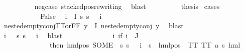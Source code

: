 \begin{isabellebody}
\ \ \ \ \ \ \ \ \isamarkupfalse%
\ neg{\isacharunderscore}{\kern0pt}case\ stacked{\isacharunderscore}{\kern0pt}pos{\isacharunderscore}{\kern0pt}rewriting\ \isamarkupfalse%
\ blast\isanewline
\ \ \ \ \ \ \isamarkupfalse%
\ \isamarkupfalse%
\ {\isacharquery}{\kern0pt}thesis\ \isamarkupfalse%
{\isacharparenleft}{\kern0pt}cases{\isacharparenright}{\kern0pt}\isanewline
\ \ \ \ \ \ \ \ \isamarkupfalse%
\ {}\isanewline
\ \ \ \ \ \ \ \ \isamarkupfalse%
\ False\ \isamarkupfalse%
\ {\isachardoublequoteopen}{\isasymforall}i\ {\isasymin}\ I{\isachardot}{\kern0pt}\ {\isacharparenleft}{\kern0pt}{\isasymforall}s{\isachardot}{\kern0pt}\ {\isacharparenleft}{\kern0pt}s\ {\isasymTurnstile}\ {\isacharparenleft}{\kern0pt}{\isasymPhi}\ i{\isacharparenright}{\kern0pt}{\isacharparenright}{\kern0pt}{\isacharparenright}{\kern0pt}{\isachardoublequoteclose}\isanewline
\ \ \ \ \ \ \ \ \isamarkupfalse%
\ nested{\isacharunderscore}{\kern0pt}empty{\isacharunderscore}{\kern0pt}conj{\isacharunderscore}{\kern0pt}TT{\isacharunderscore}{\kern0pt}or{\isacharunderscore}{\kern0pt}FF\ {\isacartoucheopen}{\isasymforall}y{\isasymin}{\isasymPhi}\ {\isacharbackquote}{\kern0pt}\ I{\isachardot}{\kern0pt}\ nested{\isacharunderscore}{\kern0pt}empty{\isacharunderscore}{\kern0pt}conj\ y{\isacartoucheclose}\ \isamarkupfalse%
\ blast\ \isanewline
\ \ \ \ \ \ \ \ \isamarkupfalse%
\ {\isachardoublequoteopen}{\isasymforall}i\ {\isasymin}\ {\isacharbraceleft}{\kern0pt}{\isacharbraceright}{\kern0pt}{\isachardot}{\kern0pt}\ {\isacharparenleft}{\kern0pt}{\isasymforall}s{\isachardot}{\kern0pt}\ {\isacharparenleft}{\kern0pt}s\ {\isasymTurnstile}\ {\isacharparenleft}{\kern0pt}{\isasymPhi}\ i{\isacharparenright}{\kern0pt}{\isacharparenright}{\kern0pt}{\isacharparenright}{\kern0pt}{\isachardoublequoteclose}\ \isamarkupfalse%
\ blast\isanewline
\ \ \ \ \ \ \ \ \isamarkupfalse%
\ {\isasymPsi}\ \ {\isachardoublequoteopen}{\isasymPsi}\ {\isasymequiv}\ {\isacharparenleft}{\kern0pt}{\isasymlambda}i{\isachardot}{\kern0pt}\ {\isacharparenleft}{\kern0pt}if\ i\ {\isasymin}\ J\ \isanewline
\ \ \ \ \ \ \ \ \ \ \ \ \ \ then\ {\isacharparenleft}{\kern0pt}hml{\isacharunderscore}{\kern0pt}pos\ {\isacharparenleft}{\kern0pt}SOME\ {\isasymalpha}{\isachardot}{\kern0pt}\ {\isacharparenleft}{\kern0pt}{\isasymforall}s{\isachardot}{\kern0pt}\ {\isacharparenleft}{\kern0pt}s\ {\isasymTurnstile}\ {\isacharparenleft}{\kern0pt}{\isasymPhi}\ i{\isacharparenright}{\kern0pt}{\isacharparenright}{\kern0pt}\ {\isasymlongleftrightarrow}\ {\isacharparenleft}{\kern0pt}s\ {\isasymTurnstile}\ {\isacharparenleft}{\kern0pt}hml{\isacharunderscore}{\kern0pt}pos\ {\isasymalpha}\ TT{\isacharparenright}{\kern0pt}{\isacharparenright}{\kern0pt}{\isacharparenright}{\kern0pt}{\isacharparenright}{\kern0pt}\ TT{\isacharcolon}{\kern0pt}{\isacharcolon}{\kern0pt}\ {\isacharparenleft}{\kern0pt}{\isacharprime}{\kern0pt}a{\isacharcomma}{\kern0pt}\ {\isacharprime}{\kern0pt}s{\isacharparenright}{\kern0pt}\ hml{\isacharparenright}{\kern0pt}\ \isanewline

\end{isabellebody}
